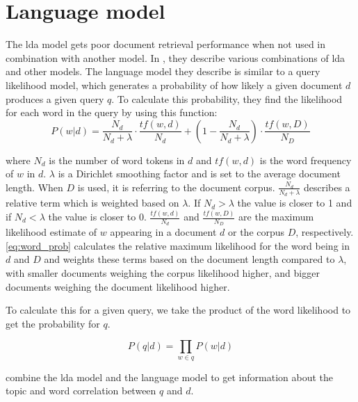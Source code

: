 \section{Language model}
The \gls{lda} model gets poor document retrieval performance when not used in combination with another model\cite{yang2009topic}.
In \cite{yang2009topic}, they describe various combinations of \gls{lda} and other models. 
The language model they describe is similar to a query likelihood model, which generates a probability of how likely a given document $d$ produces a given query $q$.
To calculate this probability, they find the likelihood for each word in the query by using this function:
\begin{equation}\label{eq:word_prob}
	P(w|d) = \frac{N_d}{N_d + \lambda} \cdot \frac{tf(w,d)}{N_d} + (1 - \frac{N_d}{N_d + \lambda}) \cdot \frac{tf(w,D)}{N_D}
\end{equation}

where $N_d$ is the number of word tokens in $d$ and $tf(w,d)$ is the word frequency of $w$ in $d$. $\lambda$ is a Dirichlet smoothing factor and is set to the average document length.
When $D$ is used, it is referring to the document corpus.
$ \frac{N_d}{N_d + \lambda} $ describes a relative term which is weighted based on $ \lambda $. If $N_d > \lambda$ the value is closer to 1 and if $ N_d < \lambda $ the value is closer to 0.
$ \frac{tf(w,d)}{N_d} $ and $\frac{tf(w,D)}{N_D}$ are the maximum likelihood estimate of $w$ appearing in a document $d$ or the corpus $D$, respectively.
\autoref{eq:word_prob} calculates the relative maximum likelihood for the word being in $ d $ and $ D $ and weights these terms based on the document length compared to $\lambda$, with smaller documents weighing the corpus likelihood higher, and bigger documents weighing the document likelihood higher.

To calculate this for a given query, we take the product of the word likelihood to get the probability for $q$.

\begin{equation}\label{eq:query_prob}
	P(q|d) = \prod_{w \in q} P(w|d)
\end{equation}

\cite{yang2009topic} combine the \gls{lda} model and the language model to get information about the topic and word correlation between $q$ and $d$.
